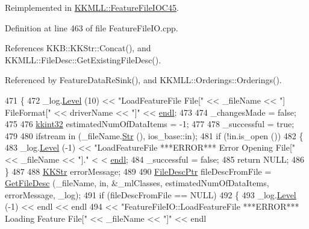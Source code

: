 Reimplemented in \hyperlink{class_k_k_m_l_l_1_1_feature_file_i_o_c45_a5223da28157b11024119c1edd93143c2}{K\+K\+M\+L\+L\+::\+Feature\+File\+I\+O\+C45}.



Definition at line 463 of file Feature\+File\+I\+O.\+cpp.



References K\+K\+B\+::\+K\+K\+Str\+::\+Concat(), and K\+K\+M\+L\+L\+::\+File\+Desc\+::\+Get\+Existing\+File\+Desc().



Referenced by Feature\+Data\+Re\+Sink(), and K\+K\+M\+L\+L\+::\+Orderings\+::\+Orderings().


\begin{DoxyCode}
471 \{
472   \_log.\hyperlink{class_k_k_b_1_1_run_log_a32cf761d7f2e747465fd80533fdbb659}{Level} (10) << \textcolor{stringliteral}{"LoadFeatureFile  File["} << \_fileName << \textcolor{stringliteral}{"]  FileFormat["} << driverName << \textcolor{stringliteral}{"]"} <<
       \hyperlink{namespace_k_k_b_ad1f50f65af6adc8fa9e6f62d007818a8}{endl};
473   
474   \_changesMade = \textcolor{keyword}{false};
475 
476   \hyperlink{namespace_k_k_b_a8fa4952cc84fda1de4bec1fbdd8d5b1b}{kkint32}  estimatedNumOfDataItems = -1;
477   
478   \_successful = \textcolor{keyword}{true};
479 
480   ifstream  in (\_fileName.\hyperlink{class_k_k_b_1_1_k_k_str_ad574e6c0fe7f6ce1ba3ab0a8ce2fbd52}{Str} (), ios\_base::in);
481   \textcolor{keywordflow}{if}  (!in.is\_open ())
482   \{
483     \_log.\hyperlink{class_k_k_b_1_1_run_log_a32cf761d7f2e747465fd80533fdbb659}{Level} (-1) << \textcolor{stringliteral}{"LoadFeatureFile   ***ERROR***      Error Opening File["} << \_fileName << \textcolor{stringliteral}{"]."} <
      < \hyperlink{namespace_k_k_b_ad1f50f65af6adc8fa9e6f62d007818a8}{endl};
484     \_successful = \textcolor{keyword}{false};
485     \textcolor{keywordflow}{return}  NULL;
486   \}
487 
488   \hyperlink{class_k_k_b_1_1_k_k_str}{KKStr}  errorMessage;
489   
490   \hyperlink{class_k_k_m_l_l_1_1_file_desc}{FileDescPtr}  fileDescFromFile = \hyperlink{class_k_k_m_l_l_1_1_feature_file_i_o_a485b98b04884febb9423e7c613e2d654}{GetFileDesc} (\_fileName, in, &\_mlClasses, 
      estimatedNumOfDataItems, errorMessage, \_log);
491   \textcolor{keywordflow}{if}  (fileDescFromFile == NULL)
492   \{
493     \_log.\hyperlink{class_k_k_b_1_1_run_log_a32cf761d7f2e747465fd80533fdbb659}{Level} (-1) << endl << endl 
494                    << \textcolor{stringliteral}{"FeatureFileIO::LoadFeatureFile    ***ERROR***     Loading Feature File["} << 
      \_fileName << \textcolor{stringliteral}{"]"} << endl

\end{DoxyCode}
